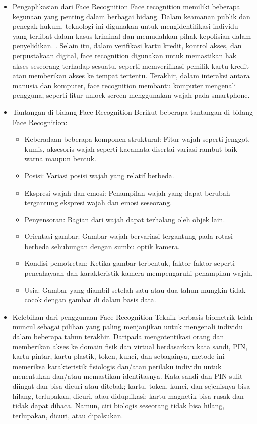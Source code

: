 \documentclass[conference]{IEEEtran}
\begin{document}
\begin{itemize}
    \item Pengaplikasian dari Face Recognition
    \hspace*{0.5cm} Face recognition memiliki beberapa kegunaan yang penting dalam berbagai bidang. Dalam keamanan publik dan penegak hukum, teknologi ini digunakan untuk mengidentifikasi individu yang terlibat dalam kasus kriminal dan memudahkan pihak kepolisian dalam penyelidikan. \cite{Alsmadi2017}. Selain itu, dalam verifikasi kartu kredit, kontrol akses, dan perpustakaan digital, face recognition digunakan untuk memastikan hak akses seseorang terhadap sesuatu, seperti memverifikasi pemilik kartu kredit atau memberikan akses ke tempat tertentu. Terakhir, dalam interaksi antara manusia dan komputer, face recognition membantu komputer mengenali pengguna, seperti fitur unlock screen menggunakan wajah pada smartphone.

    \item Tantangan di bidang Face Recognition 
    \hspace{0.5cm} Berikut beberapa tantangan di bidang Face Recognition:
        \begin{itemize}
          \item Keberadaan beberapa komponen struktural: Fitur wajah seperti jenggot, kumis, aksesoris wajah seperti kacamata disertai variasi rambut baik warna maupun bentuk.
          \item Posisi: Variasi posisi wajah yang relatif berbeda.
          \item Ekspresi wajah dan emosi: Penampilan wajah yang dapat berubah tergantung ekspresi wajah dan emosi seseorang.
          \item Penyensoran: Bagian dari wajah dapat terhalang oleh objek lain.
          \item Orientasi gambar: Gambar wajah bervariasi tergantung pada rotasi berbeda sehubungan dengan sumbu optik kamera.
          \item Kondisi pemotretan: Ketika gambar terbentuk, faktor-faktor seperti pencahayaan dan karakteristik kamera mempengaruhi penampilan wajah.
          \item Usia: Gambar yang diambil setelah satu atau dua tahun mungkin tidak cocok dengan gambar di dalam basis data.
        \end{itemize}

    \item Kelebihan dari penggunaan Face Recognition
    \hspace{0.5cm}
    Teknik berbasis biometrik telah muncul sebagai pilihan yang paling menjanjikan untuk mengenali individu dalam beberapa tahun terakhir. Daripada mengotentikasi orang dan memberikan akses ke domain fisik dan virtual berdasarkan kata sandi, PIN, kartu pintar, kartu plastik, token, kunci, dan sebagainya, metode ini memeriksa karakteristik fisiologis dan/atau perilaku individu untuk menentukan dan/atau memastikan identitasnya. Kata sandi dan PIN sulit diingat dan bisa dicuri atau ditebak; kartu, token, kunci, dan sejenisnya bisa hilang, terlupakan, dicuri, atau diduplikasi; kartu magnetik bisa rusak dan tidak dapat dibaca. Namun, ciri biologis seseorang tidak bisa hilang, terlupakan, dicuri, atau dipalsukan.


\end{itemize}
\end{document}
